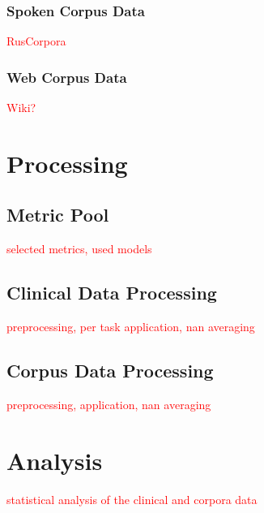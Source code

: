 \subsubsection{Spoken Corpus Data}
\textcolor{red}{RusCorpora}

\subsubsection{Web Corpus Data}
\textcolor{red}{Wiki?}




\section{Processing}
\label{sec:methods:processing}


\subsection{Metric Pool}
\label{sec:methods:processing:metrics}
\textcolor{red}{selected metrics, used models}

\subsection{Clinical Data Processing}
\label{sec:methods:processing:clinical}
\textcolor{red}{preprocessing, per task application, nan averaging}

\subsection{Corpus Data Processing}
\label{sec:methods:processing:corpus}
\textcolor{red}{preprocessing, application, nan averaging}


\section{Analysis}
\label{sec:methods:analysis}

\textcolor{red}{statistical analysis of the clinical and corpora data}